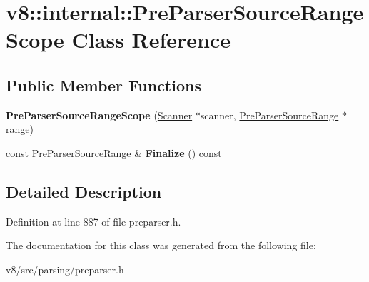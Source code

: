\hypertarget{classv8_1_1internal_1_1PreParserSourceRangeScope}{}\section{v8\+:\+:internal\+:\+:Pre\+Parser\+Source\+Range\+Scope Class Reference}
\label{classv8_1_1internal_1_1PreParserSourceRangeScope}
\subsection*{Public Member Functions}
\begin{DoxyCompactItemize}
\item 
\mbox{\label{classv8_1_1internal_1_1PreParserSourceRangeScope_af6e96fc5e12b5bbf40fe4fefdc4ddfe0}} 
{\bfseries Pre\+Parser\+Source\+Range\+Scope} (\mbox{\hyperlink{classv8_1_1internal_1_1Scanner}{Scanner}} $\ast$scanner, \mbox{\hyperlink{classv8_1_1internal_1_1PreParserSourceRange}{Pre\+Parser\+Source\+Range}} $\ast$range)
\item 
\mbox{\label{classv8_1_1internal_1_1PreParserSourceRangeScope_aca6d69ad1645e20572df212165f24770}} 
const \mbox{\hyperlink{classv8_1_1internal_1_1PreParserSourceRange}{Pre\+Parser\+Source\+Range}} \& {\bfseries Finalize} () const
\end{DoxyCompactItemize}


\subsection{Detailed Description}


Definition at line 887 of file preparser.\+h.



The documentation for this class was generated from the following file\+:\begin{DoxyCompactItemize}
\item 
v8/src/parsing/preparser.\+h\end{DoxyCompactItemize}

